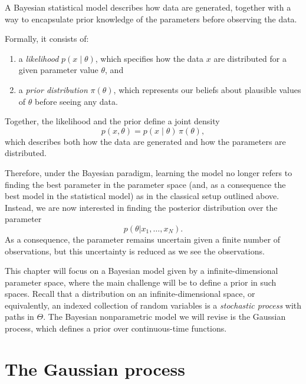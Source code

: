 \begin{definition}
A Bayesian statistical model describes how data are generated, together with a way to encapsulate prior knowledge of the parameters before observing the data.

Formally, it consists of:
\begin{enumerate}
  \item a \emph{likelihood} $p(x \mid \theta)$, which specifies how the data $x$ are distributed for a given parameter value $\theta$, and
  \item a \emph{prior distribution} $\pi(\theta)$, which represents our beliefs about plausible values of $\theta$ before seeing any data.
\end{enumerate}

Together, the likelihood and the prior define a joint density
\[
p(x,\theta) = p(x \mid \theta)\,\pi(\theta),
\]
which describes both how the data are generated and how the parameters are distributed.
\end{definition}

Therefore, under the Bayesian paradigm, learning the model no longer refers to finding the best parameter in the parameter space (and, as a consequence the best model in the statistical model) as in the classical setup outlined above. Instead, we are now interested in finding the posterior distribution over the parameter 
\begin{equation}
    p(\theta|x_1,\ldots,x_N).
\end{equation}
As a consequence, the parameter remains uncertain given a finite number of observations, but this uncertainty is reduced as we see the observations.

This chapter will focus on a Bayesian model given by a infinite-dimensional parameter space, where the main challenge will be to define a prior in such spaces.  Recall that a distribution on an infinite-dimensional space, or equivalently, an indexed  collection of random variables is a \emph{stochastic process} with paths in $\Theta$. The Bayesian nonparametric model we will revise is the Gaussian process, which defines a prior over continuous-time functions. 



\section{The Gaussian process}


